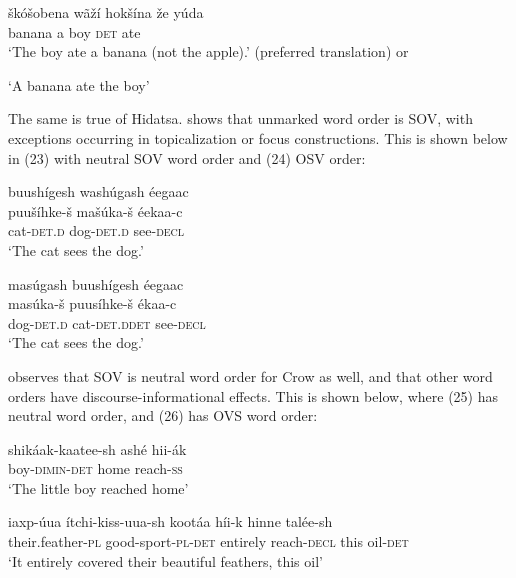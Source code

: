 \documentclass[output=paper]{LSP/langsci}
\begin{document}
\begin{exe}
\ex	\gll  \v{s}k\'o\v{s}obena w\~a\v{z}\'i 	hok\v{s}\'ina 	\v{z}e 		y\'uda \\
banana 		a 			boy 	\textsc{det} 	ate \\
\trans `The boy ate a banana (not the apple).' (preferred translation) or 

`A banana ate the boy'  \citep[49]{West2003} 
\end{exe}

The same is true of Hidatsa.  \citet{Boyle2007} shows that unmarked word order is SOV, with exceptions occurring in topicalization or focus constructions.  This is shown below in (23) with neutral SOV word order and (24) OSV order:
\pagebreak
\begin{exe}
\ex 
\glll buush\'igesh wash\'ugash \'eegaac\\
puu\v{s}\'ihke-\v{s}  ma\v{s}\'uka-\v{s} \'eekaa-c \\
cat-\textsc{det.d} dog-\textsc{det.d} see-\textsc{decl}  \\
\trans `The cat sees the dog.'  \citep[214]{Boyle2007}

\ex 
\glll mas\'ugash 		buush\'igesh 	\'eegaac\\
mas\'uka-\v{s} 		puus\'ihke-\v{s} 	\'ekaa-c \\
dog-\textsc{det.d} 		cat-\textsc{det.d}\textsc{det}	see-\textsc{decl} \\
\trans `The cat sees the dog.' \citep[214]{Boyle2007}

\end{exe}
	
\citet{Graczyk1991} observes that SOV is neutral word order for Crow as well, and that other word orders have discourse-informational effects.  This is shown below, where (25) has neutral word order, and (26) has OVS word order:

\begin{exe}
\ex \gll shik\'aak-kaatee-sh ash\'e 		hii-\'ak \\
boy-\textsc{dimin-det} 		home 	reach-\textsc{ss} \\
\trans `The little boy reached home' \citep[101]{Graczyk1991}

\ex \gll iaxp-\'uua 		\'itchi-kiss-uua-sh			koot\'aa 	h\'ii-k 	hinne		tal\'ee-sh \\
their.feather-\textsc{pl} good-sport-\textsc{pl}-\textsc{det}		entirely 	reach-\textsc{decl}	this 	oil-\textsc{det} \\
\trans `It entirely covered their beautiful feathers, this oil' \citep[103]{Graczyk1991}
\end{exe}
\end{document}
